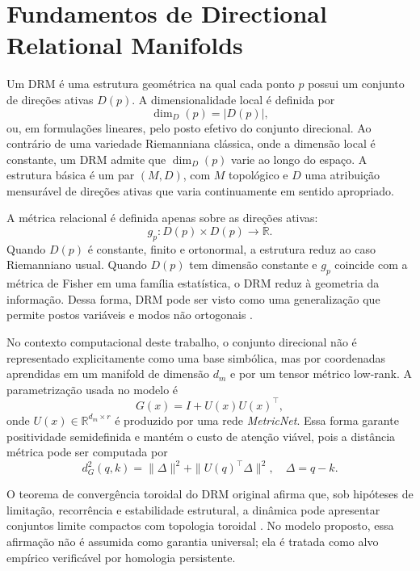 \section{Fundamentos de Directional Relational Manifolds}
\label{sec:fundamentos}

Um DRM é uma estrutura geométrica na qual cada ponto $p$ possui um conjunto de
direções ativas $D(p)$. A dimensionalidade local é definida por
\begin{equation}
  \dim_D(p) = |D(p)|,
\end{equation}
ou, em formulações lineares, pelo posto efetivo do conjunto direcional. Ao
contrário de uma variedade Riemanniana clássica, onde a dimensão local é
constante, um DRM admite que $\dim_D(p)$ varie ao longo do espaço. A estrutura
básica é um par $(M,D)$, com $M$ topológico e $D$ uma atribuição mensurável de
direções ativas que varia continuamente em sentido apropriado.

A métrica relacional é definida apenas sobre as direções ativas:
\begin{equation}
  g_p: D(p) \times D(p) \rightarrow \mathbb{R}.
\end{equation}
Quando $D(p)$ é constante, finito e ortonormal, a estrutura reduz ao caso
Riemanniano usual. Quando $D(p)$ tem dimensão constante e $g_p$ coincide com a
métrica de Fisher em uma família estatística, o DRM reduz à geometria da
informação. Dessa forma, DRM pode ser visto como uma generalização que permite
postos variáveis e modos não ortogonais \cite{amari_information_geometry,
muniz_drm_v11}.

No contexto computacional deste trabalho, o conjunto direcional não é
representado explicitamente como uma base simbólica, mas por coordenadas
aprendidas em um manifold de dimensão $d_m$ e por um tensor métrico low-rank.
A parametrização usada no modelo é
\begin{equation}
  G(x) = I + U(x) U(x)^\top,
\end{equation}
onde $U(x) \in \mathbb{R}^{d_m \times r}$ é produzido por uma rede
\emph{MetricNet}. Essa forma garante positividade semidefinida e mantém o custo
de atenção viável, pois a distância métrica pode ser computada por
\begin{equation}
  d_G^2(q,k) = \|\Delta\|^2 + \|U(q)^\top \Delta\|^2,
  \quad \Delta = q-k.
\end{equation}

O teorema de convergência toroidal do DRM original afirma que, sob hipóteses de
limitação, recorrência e estabilidade estrutural, a dinâmica pode apresentar
conjuntos limite compactos com topologia toroidal \cite{muniz_drm_v11}. No
modelo proposto, essa afirmação não é assumida como garantia universal; ela é
tratada como alvo empírico verificável por homologia persistente.
